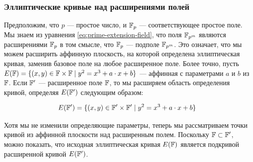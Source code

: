 \subsubsection{Эллиптические кривые над расширениями полей}
\label{sec:curve-extensions}
 Предположим, что $p$ — простое число, и $\mathbb{F}_p$ — соответствующее простое поле. Мы знаем из уравнения \eqref{eq:prime-extension-field}, что поля $\mathbb{F}_{p^m}$ являются расширениями $\mathbb{F}_p$ в том смысле, что $\mathbb{F}_{p}$ — подполе $\mathbb{F}_{p^m}$. Это означает, что мы можем расширить аффинную плоскость, на которой определена эллиптическая кривая, заменив базовое поле на любое расширенное поле. Более точно, пусть 
$E(\mathbb{F})=\{ (x,y)\in \mathbb{F} \times \mathbb{F} \;|\; y^2 = x^3 +a\cdot x +b \}$ — аффинная  с параметрами $a$ и $b$ из $\mathbb{F}$. Если $\mathbb{F}'$ — расширенное поле $\mathbb{F}$, то мы расширяем область определения кривой, определяя $E(\mathbb{F}')$ следующим образом:

\begin{equation}\label{elliptic-curve-extension}
E(\mathbb{F}')=\{ (x,y)\in \mathbb{F}' \times \mathbb{F}' \;|\; y^2 = x^3 +a\cdot x +b \}
\end{equation}   

Хотя мы не изменили определяющие параметры, теперь мы рассматриваем точки кривой из аффинной плоскости над расширенным полем. Поскольку $\mathbb{F}\subset \mathbb{F}'$, можно показать, что исходная эллиптическая кривая $E(\mathbb{F})$ является подкривой расширенной кривой $E(\mathbb{F}')$.

